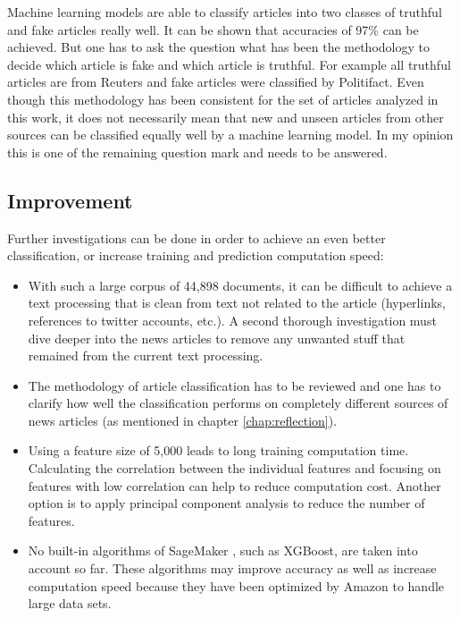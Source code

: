 \documentclass[a4paper,12pt,nottoc]{article}
\begin{document}
Machine learning models are able to classify articles into two classes of truthful and fake articles really well. It can be shown that accuracies of 97\% can be achieved. But one has to ask the question what has been the methodology to decide which article is fake and which article is truthful. For example all truthful articles are from Reuters and fake articles were classified by Politifact. Even though this methodology has been consistent for the set of articles analyzed in this work, it does not necessarily mean that new and unseen articles from other sources can be classified equally well by a machine learning model. In my opinion this is one of the remaining question mark and needs to be answered.

\subsection{Improvement}

Further investigations can be done in order to achieve an even better classification, or increase training and prediction computation speed:

\begin{itemize}
\item{With such a large corpus of 44,898 documents, it can be difficult to achieve a text processing that is clean from text not related to the article (hyperlinks, references to twitter accounts, etc.). A second thorough investigation must dive deeper into the news articles to remove any unwanted stuff that remained from the current text processing.}
\item{The methodology of article classification has to be reviewed and one has to clarify how well the classification performs on completely different sources of news articles (as mentioned in chapter \ref{chap:reflection}).}
\item{Using a feature size of 5,000 leads to long training computation time. Calculating the correlation between the individual features and focusing on features with low correlation can help to reduce computation cost. Another option is to apply principal component analysis to reduce the number of features.}
\item{No built-in algorithms of SageMaker \cite{bib:sagemaker}, such as XGBoost, are taken into account so far. These algorithms may improve accuracy as well as increase computation speed because they have been optimized by Amazon to handle large data sets.}
\end{itemize}
\end{document}
